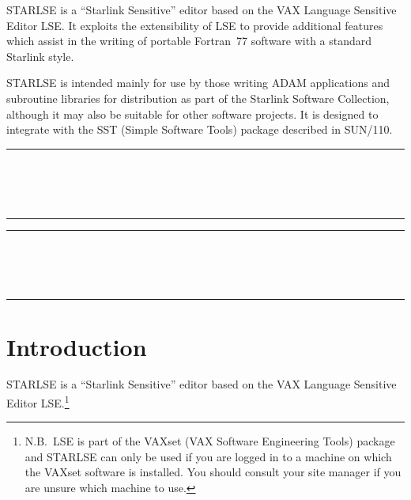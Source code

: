 \mbox{STARLSE} is a ``Starlink Sensitive'' editor based on the \mbox{VAX}
Language Sensitive Editor \mbox{LSE}. It exploits the extensibility of
\mbox{LSE} to provide additional features which assist in the writing of
portable Fortran~77 software with a standard Starlink style. 

\mbox{STARLSE} is intended mainly for use by those writing \mbox{ADAM}
applications and subroutine libraries for distribution as part of the Starlink
Software Collection, although it may also be suitable for other software
projects. It is designed to integrate with the SST (Simple Software Tools)
package described in SUN/110. 

\newpage
\markright{\stardocname}
\null\vspace {5mm}
\begin {center}
\rule{80mm}{0.5mm} \\ [1ex]
{\Large\bf \stardoctitle \\ [2.5ex]
           \stardocversion} \\ [2ex]
\rule{80mm}{0.5mm}
\end{center}

\setlength{\parskip}{0mm}
\tableofcontents
\setlength{\parskip}{\medskipamount}

\newpage
\markright{\stardocname}
\renewcommand{\thepage}{\arabic{page}}
\setcounter{page}{1}

\null\vspace {5mm}
\begin {center}
\rule{80mm}{0.5mm} \\ [1ex]
{\Large\bf \stardoctitle \\ [2.5ex]
           \stardocversion} \\ [2ex]
\rule{80mm}{0.5mm}
\end{center}
\vspace{30mm}

\section{Introduction}

\mbox{STARLSE} is a ``Starlink Sensitive'' editor based on the \mbox{VAX}
Language Sensitive Editor \mbox{LSE}.\footnote{N.B.\ \mbox{LSE} is part of
the \mbox{VAXset} (\mbox{VAX} Software Engineering Tools) package and
\mbox{STARLSE} can only be used if you are logged in to a machine on which
the \mbox{VAXset} software is installed. You should consult your site
manager if you are unsure which machine to use.} 
 
